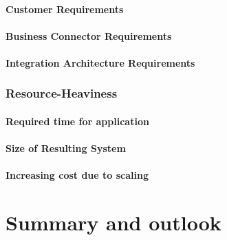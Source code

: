 \documentclass[
     12pt,         %
     a4paper,      %
     BCOR10mm,     %
     DIV14,        %
     ]{scrreprt}
\begin{document}
\subsubsection{Customer Requirements}

\subsubsection{Business Connector Requirements}

\subsubsection{Integration Architecture Requirements}

\subsection{Resource-Heaviness}

\subsubsection{Required time for application}

\subsubsection{Size of Resulting System}

\subsubsection{Increasing cost due to scaling}

\chapter{Summary and outlook}




\end{document}
